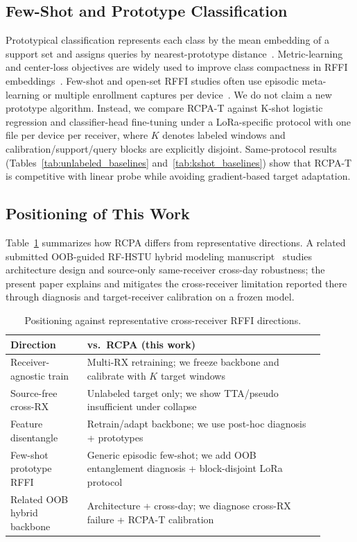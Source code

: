 \subsection{Few-Shot and Prototype Classification}
Prototypical classification represents each class by the mean embedding of a support set and assigns queries by nearest-prototype distance~\cite{snell2017prototypical}.
Metric-learning and center-loss objectives are widely used to improve class compactness in RFFI embeddings~\cite{wen2016center_loss,khosla2020supcon,shen2022scalable_lora_rffi}.
Few-shot and open-set RFFI studies often use episodic meta-learning or multiple enrollment captures per device~\cite{cekic2020robust_wireless_fingerprinting}.
We do not claim a new prototype algorithm.
Instead, we compare RCPA-T against K-shot logistic regression and classifier-head fine-tuning under a LoRa-specific protocol with one file per device per receiver, where $K$ denotes labeled windows and calibration/support/query blocks are explicitly disjoint.
Same-protocol results (Tables~\ref{tab:unlabeled_baselines} and~\ref{tab:kshot_baselines}) show that RCPA-T is competitive with linear probe while avoiding gradient-based target adaptation.

\subsection{Positioning of This Work}
Table~\ref{tab:related_compare} summarizes how RCPA differs from representative directions.
A related submitted OOB-guided RF-HSTU hybrid modeling manuscript~\cite{paper1_placeholder} studies architecture design and source-only same-receiver cross-day robustness; the present paper explains and mitigates the cross-receiver limitation reported there through diagnosis and target-receiver calibration on a frozen model.

\begin{table}[t]
\caption{Positioning against representative cross-receiver RFFI directions.}
\label{tab:related_compare}
\centering
\small
\begin{tabular}{p{0.22\linewidth}p{0.68\linewidth}}
\toprule
Direction & vs.\ RCPA (this work) \\
\midrule
Receiver-agnostic train & Multi-RX retraining; we freeze backbone and calibrate with $K$ target windows \\
Source-free cross-RX & Unlabeled target only; we show TTA/pseudo insufficient under collapse \\
Feature disentangle & Retrain/adapt backbone; we use post-hoc diagnosis + prototypes \\
Few-shot prototype RFFI & Generic episodic few-shot; we add OOB entanglement diagnosis + block-disjoint LoRa protocol \\
Related OOB hybrid backbone~\cite{paper1_placeholder} & Architecture + cross-day; we diagnose cross-RX failure + RCPA-T calibration \\
\bottomrule
\end{tabular}
\end{table}
